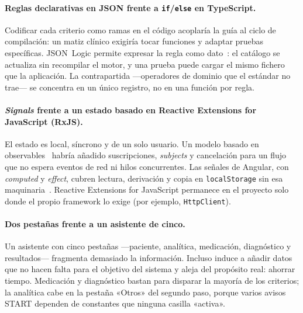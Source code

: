 \paragraph{Reglas declarativas en JSON frente a \texttt{if}/\texttt{else}
en TypeScript.}
Codificar cada criterio como ramas en el código acoplaría la guía al
ciclo de compilación: un matiz clínico exigiría tocar funciones y
adaptar pruebas específicas. JSON~Logic permite expresar la regla como
dato~\cite{jsonlogic}: el catálogo se actualiza sin recompilar el
motor, y una prueba puede cargar el mismo fichero que la aplicación.
La contrapartida ---operadores de dominio que el estándar no trae--- se
concentra en un único registro, no en una función por regla.

\paragraph{\textit{Signals} frente a un estado basado en
Reactive Extensions for JavaScript (RxJS).}
El estado es local, síncrono y de un solo usuario. Un modelo basado
en observables~\cite{rxjs} habría añadido suscripciones,
\textit{subjects} y cancelación para un flujo que no espera eventos
de red ni hilos concurrentes. Las señales de Angular, con
\textit{computed} y \textit{effect}, cubren lectura, derivación y
copia en \texttt{localStorage} sin esa maquinaria~\cite{angular2026}.
Reactive Extensions for JavaScript permanece en el proyecto solo donde
el propio framework lo exige (por ejemplo, \texttt{HttpClient}).

\paragraph{Dos pestañas frente a un asistente de cinco.}
Un asistente con cinco pestañas ---paciente, analítica, medicación,
diagnóstico y resultados--- fragmenta demasiado la información. Incluso
induce a añadir datos que no hacen falta para el objetivo del sistema y
aleja del propósito real: ahorrar tiempo. Medicación y diagnóstico
bastan para disparar la mayoría de los criterios; la analítica cabe en
la pestaña «Otros» del segundo paso, porque varios avisos START
dependen de constantes que ninguna casilla «activa».
